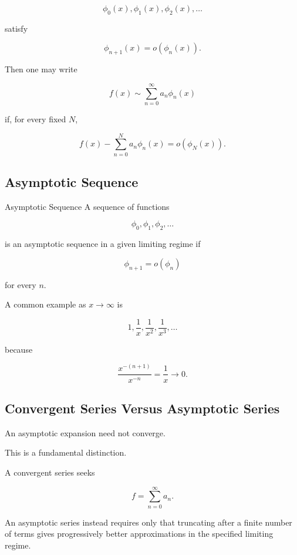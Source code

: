 \[
\phi_0(x),
\phi_1(x),
\phi_2(x),\ldots
\]

satisfy

\[
\phi_{n+1}(x)=o(\phi_n(x)).
\]

Then one may write

\[
\boxed{
f(x)
\sim
\sum_{n=0}^{\infty}
a_n\phi_n(x)
}
\]

if, for every fixed \(N\),

\[
\boxed{
f(x)
-
\sum_{n=0}^{N}
a_n\phi_n(x)
=
o(\phi_N(x)).
}
\]

\subsection{Asymptotic Sequence}
\label{subsec:asymptotic-sequence}

\begin{definitionbox}{Asymptotic Sequence}
A sequence of functions

\[
\phi_0,\phi_1,\phi_2,\ldots
\]

is an asymptotic sequence in a given limiting regime if

\[
\boxed{
\phi_{n+1}=o(\phi_n)
}
\]

for every \(n\).
\end{definitionbox}

A common example as \(x\to\infty\) is

\[
\boxed{
1,
\frac1x,
\frac1{x^2},
\frac1{x^3},
\ldots
}
\]

because

\[
\frac{x^{-(n+1)}}{x^{-n}}
=
\frac1x
\to0.
\]

\subsection{Convergent Series Versus Asymptotic Series}
\label{subsec:convergent-versus-asymptotic-series}

An asymptotic expansion need not converge.

This is a fundamental distinction.

A convergent series seeks

\[
\boxed{
f
=
\sum_{n=0}^{\infty}a_n.
}
\]

An asymptotic series instead requires only that truncating after a finite
number of terms gives progressively better approximations in the
specified limiting regime.

